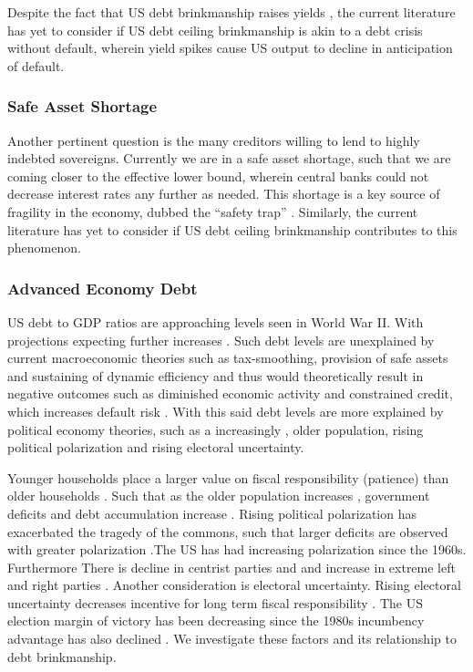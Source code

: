 \documentclass[
  12pt]{article}
\begin{document}
Despite the fact that US debt brinkmanship raises yields
\citep{nippani2017}, the current literature has yet to consider if US
debt ceiling brinkmanship is akin to a debt crisis without default,
wherein yield spikes cause US output to decline in anticipation of
default.

\hypertarget{safe-asset-shortage}{%
\subsubsection{Safe Asset Shortage}\label{safe-asset-shortage}}

Another pertinent question is the many creditors willing to lend to
highly indebted sovereigns. Currently we are in a safe asset shortage,
such that we are coming closer to the effective lower bound, wherein
central banks could not decrease interest rates any further as needed.
This shortage is a key source of fragility in the economy, dubbed the
``safety trap'' \citep{caballero2017} . Similarly, the current
literature has yet to consider if US debt ceiling brinkmanship
contributes to this phenomenon.

\hypertarget{advanced-economy-debt}{%
\subsubsection{Advanced Economy Debt}\label{advanced-economy-debt}}

US debt to GDP ratios are approaching levels seen in World War II. With
projections expecting further increases
\citep{congressionalbudgetoffice2023}. Such debt levels are unexplained
by current macroeconomic theories such as tax-smoothing, provision of
safe assets and sustaining of dynamic efficiency and thus would
theoretically result in negative outcomes such as diminished economic
activity and constrained credit, which increases default risk
\citep{yared2019, battaglini2016, romer2018, obstfeld}. With this said
debt levels are more explained by political economy theories, such as a
increasingly , older population, rising political polarization and
rising electoral uncertainty.

Younger households place a larger value on fiscal responsibility
(patience) than older households \citep{wolter2013}. Such that as the
older population increases , government deficits and debt accumulation
increase
\citep{jackson2014, jackson2015, cukierman1989, tabellini1991, yared2019}.
Rising political polarization has exacerbated the tragedy of the
commons, such that larger deficits are observed with greater
polarization \citep{hertzberg2016}.The US has had increasing
polarization since the 1960s. Furthermore There is decline in centrist
parties and and increase in extreme left and right parties
\citep{funke2016, azzimonti2018}. Another consideration is electoral
uncertainty. Rising electoral uncertainty decreases incentive for long
term fiscal responsibility \citep{drazen2000, alt2006}. The US election
margin of victory has been decreasing since the 1980s incumbency
advantage has also declined \citep{jacobson2015}. We investigate these
factors and its relationship to debt brinkmanship.
\end{document}

